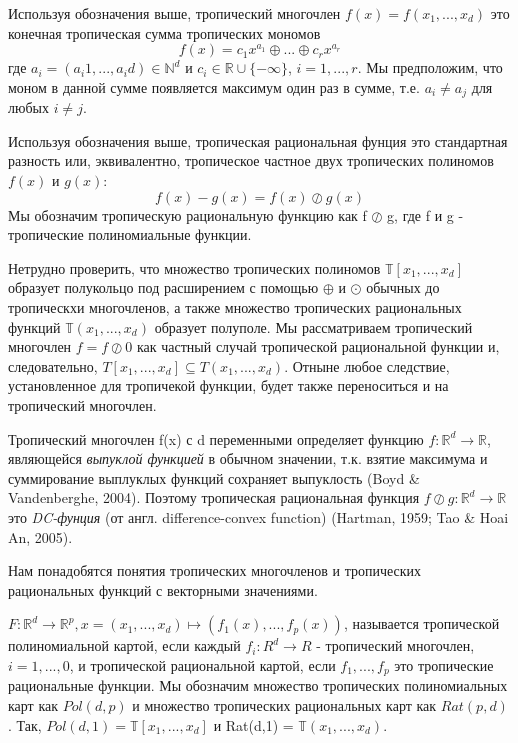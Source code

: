 \documentclass[russian]{lecture-notes}
\begin{document}
	\begin{Definition}
		Используя обозначения выше, тропический многочлен $f(x) = f(x_1,...,x_d)$ это конечная тропическая сумма тропических мономов
		\begin{equation*}
		f(x) = {c_1} x^{a_1} \oplus ... \oplus {c_r}x^{a_r}
		\end{equation*}
		где $a_i = (a_i1,...,a_id) \in \mathbb{N}^d$ и $c_i \in \mathbb{R} \cup \{- \infty\}$, $i=1,...,r$. Мы предположим, что моном в данной сумме появляется максимум один раз в сумме, т.е. $a_i \ne a_j$ для любых $i \ne j$. 
	\end{Definition}

	\begin{Definition}
		Используя обозначения выше, тропическая рациональная фунция это стандартная разность или, эквивалентно, тропическое частное двух тропических полиномов $f(x)$ и $g(x)$:
		\begin{equation*}
			f(x) - g(x) = f(x) \oslash g(x)
		\end{equation*}
		Мы обозначим тропическую рациональную функцию как f $\oslash$ g, где f и g - тропические полиномиальные функции.
	\end{Definition}

	Нетрудно проверить, что множество тропических полиномов $\mathbb{T}[x_1,...,x_d]$ образует полукольцо под расширением с помощью $\oplus$ и $\odot$ обычных до тропическхи многочленов, а также множество тропических рациональных функций $\mathbb{T}(x_1,...,x_d)$ образует полуполе. Мы рассматриваем тропический многочлен $f = f \oslash 0$ как частный случай тропической рациональной функции и, следовательно, $T[x_1,...,x_d] \subseteq T(x_1,...,x_d)$. Отныне любое следствие, установленное для тропичекой функции, будет также переноситься и на тропический многочлен.
	
	Тропический многочлен f(x) с d переменными определяет функцию $f: \mathbb{R}^d \to \mathbb{R}$, являющейся \textit{выпуклой функцией} в обычном значении, т.к. взятие максимума и суммирование выплуклых функций сохраняет выпуклость (Boyd \& Vandenberghe, 2004). Поэтому тропическая рациональная функция $f \oslash g : \mathbb{R}^d \to \mathbb{R}$ это \textit{DC-фунция} (от англ. difference-convex function) (Hartman, 1959; Tao \& Hoai An, 2005).
	
	Нам понадобятся понятия тропических многочленов и тропических рациональных функций с векторными значениями.
	
	\begin{Definition}
		$ F : \mathbb{R}^d \to \mathbb{R}^p, x = (x_1,...,x_d) \mapsto (f_1(x),...,f_p(x))$, называется тропической полиномиальной картой, если каждый $f_i: R^d \to R$ - тропический многочлен, $i = 1,...,0$, и тропической рациональной картой, если $f_1,...,f_p$ это тропические рациональные функции. Мы обозначим множество тропических полиномиальных карт как $Pol(d, p)$ и множество тропических рациональных карт как $Rat(p, d)$. Так, $Pol(d,1) = \mathbb{T}[x_1,...,x_d]$ и Rat(d,1) = $\mathbb{T}(x_1,...,x_d)$.
	\end{Definition} 
\end{document}
